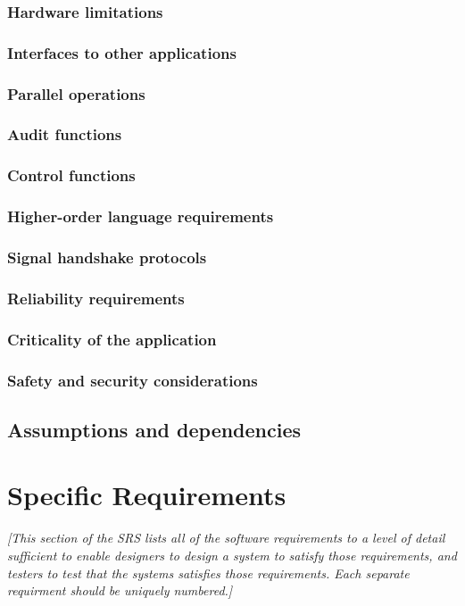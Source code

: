 \documentclass{article}
\begin{document}
\subsubsection{Hardware limitations}
\subsubsection{Interfaces to other applications}
\subsubsection{Parallel operations}
\subsubsection{Audit functions}
\subsubsection{Control functions}
\subsubsection{Higher-order language requirements}
\subsubsection{Signal handshake protocols}
\subsubsection{Reliability requirements}
\subsubsection{Criticality of the application}
\subsubsection{Safety and security considerations}

\subsection{Assumptions and dependencies}


\section{Specific Requirements}
\label{sec:specific}
\emph{[This section of the \ac{SRS} lists all of the software requirements to
  a level of detail sufficient to enable designers to design a system to
  satisfy those requirements, and testers to test that the systems satisfies
  those requirements. Each separate requirment should be uniquely numbered.]}
\end{document}

